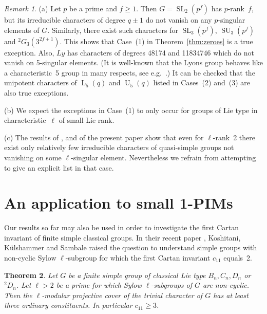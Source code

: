 \documentclass{ert-l}
\newcommand{\PSL}{{\operatorname{L}}}
\newcommand{\SL}{{\operatorname{SL}}}
\newcommand{\SU}{{\operatorname{SU}}}
\newcommand{\PSU}{{\operatorname{U}}}
\newcommand{\tw}[1]{{}^#1\!}
\newtheorem{thm}{Theorem}[section]
\theoremstyle{definition}
\theoremstyle{remark}
\newtheorem{rem}[thm]{Remark}
\begin{document}
\begin{rem}
(a) Let $p$ be a prime and $f\ge1$. Then $G=\SL_2(p^f)$ has $p$-rank~$f$, but
its irreducible characters of degree $q\pm1$ do not vanish on any $p$-singular
elements of $G$. Similarly, there exist such characters for $\SL_3(p^f)$,
$\SU_3(p^f)$ and $^2G_3(3^{2f+1})$. This shows that Case~(1) in
Theorem~\ref{thm:zeroes} is a true exception. Also, $Ly$ has characters of
degrees 48174 and 11834746 which do not vanish on 5-singular elements. (It is
well-known that the Lyons group behaves like a characteristic~5 group in many
respects, see e.g.~\cite{PR}.)
It can be checked that the unipotent characters of $\PSL_5(q)$ and $\PSU_5(q)$
listed in Cases~(2) and~(3) are also true exceptions. \par
(b) We expect the exceptions in Case~(1) to only occur for groups of Lie
type in characteristic~$\ell$ of small Lie rank.  \par
(c) The results of \cite{LMS13}, \cite{LM15} and of the present paper show
that even for $\ell$-rank~2 there exist only relatively few irreducible
characters of quasi-simple groups not vanishing on some $\ell$-singular
element. Nevertheless we refrain from attempting to give an explicit list in
that case.
\end{rem}


\section{An application to small 1-PIMs }   \label{sec:PIMs}

Our results so far may also be used in order to investigate the first Cartan
invariant of finite simple classical groups. In their recent paper \cite{KKS},
Koshitani, K\"ulshammer and Sambale raised the question to understand simple
groups with non-cyclic Sylow $\ell$-subgroup for which the first Cartan
invariant $c_{11}$ equals~2.

\begin{thm}   \label{thm:cartan}
 Let $G$ be a finite simple group of classical Lie type $B_n,C_n,D_n$ or
 $\tw2D_n$. Let $\ell>2$ be a prime for which Sylow $\ell$-subgroups of $G$
 are non-cyclic. Then the $\ell$-modular projective cover of the trivial
 character of $G$ has at least three ordinary constituents. In particular
 $c_{11}\ge3$.
\end{thm}
\end{document}
